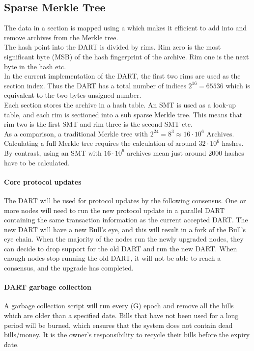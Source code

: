 \subsection{Sparse Merkle Tree}
The data in a section is mapped using a  which makes it efficient to add into and remove archives from the Merkle tree. \\
The hash point into the DART is divided by rims. Rim zero is the most significant byte (MSB) of the hash fingerprint of the archive. Rim one is the next byte in the hash etc. \\
In the current implementation of the DART, the first two rims are used as the section index. Thus the DART has a total number of indices $2^{16} = 65536$ which is equivalent to the two bytes unsigned number. \\
Each section stores the archive in a hash table. An SMT is used as a look-up table, and each rim is sectioned into a sub sparse Merkle tree. This means that rim two is the first SMT and rim three is the second SMT etc. \\ 
As a comparison, a traditional Merkle tree with $2^{24} = 8^3 \approx 16 \cdot 10^{6}$ Archives. Calculating a full Merkle tree requires the calculation of around $32 \cdot 10^6$ hashes. By contrast, using an SMT with $16 \cdot 10^{6}$  archives mean just around 2000 hashes have to be calculated.

\paragraph{Core protocol updates\\} 
The DART will be used for protocol updates by the following consensus. One or more nodes will need to run the new protocol update in a parallel DART containing the same transaction information as the current accepted DART. The new DART will have a new Bull's eye, and this will result in a fork of the Bull's eye chain. When the majority of the nodes run the newly upgraded nodes, they can decide to drop support for the old DART and run the new DART. When enough nodes stop running the old DART, it will not be able to reach a consensus, and the upgrade has completed.

\paragraph{DART garbage collection\\} 
A garbage collection script will run every (G) epoch and remove all the bills which are older than a specified date. Bills that have not been used for a long period will be burned, which ensures that the system does not contain dead bills/money.
It is the owner's responsibility to recycle their bills before the expiry date.

